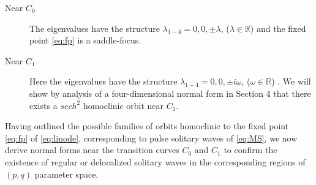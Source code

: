 \begin{description}
\item[Near $C_0$] 
The eigenvalues have the structure $\lambda_{1-4} = 0,0,\pm \lambda$, ($\lambda \in \mathbb{R}$) and the fixed point
\eqref{eq:fp} is a saddle-focus.
\item[Near $C_1$] 
Here the eigenvalues have the structure $\lambda_{1-4} = 0,0,\pm i \omega $, ($\omega \in \mathbb{R} $) . We will show by analysis of a
four-dimensional normal form in Section 4 that there exists a $sech^2$ homoclinic orbit near $C_1$.
\end{description}

Having outlined the possible families of orbits homoclinic to the fixed point \eqref{eq:fp} of \eqref{eq:linode},
corresponding to pulse solitary waves of \eqref{eq:MS}, we now derive normal forms near the transition curves $C_0$ and $C_1$
to confirm the existence of regular or delocalized solitary waves in the corresponding regions of $\left(p,q\right)$ parameter space.

